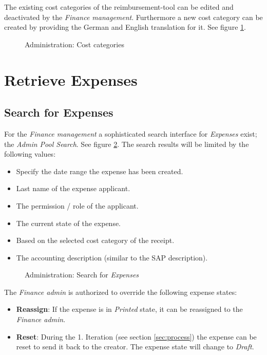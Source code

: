 The existing cost categories of the reimbursement-tool can be edited and deactivated by the \textit{Finance management}. Furthermore a new cost category can be created by providing the German and English translation for it. See figure \ref{fig:admin-costcategories}.

\begin{figure}[H]
    \centering
    \caption{Administration: Cost categories}
    \label{fig:admin-costcategories}
\end{figure}

\section{Retrieve Expenses}
\subsection{Search for Expenses}

For the \textit{Finance management} a sophisticated search interface for \textit{Expenses} exist; the \textit{Admin Pool Search}. See figure \ref{fig:admin-search}. The search results will be limited by the following values:

\begin{itemize}
    \item Specify the date range the expense has been created.
    \item Last name of the expense applicant.
    \item The permission / role of the applicant.
    \item The current state of the expense.
    \item Based on the selected cost category of the receipt.
    \item The accounting description (similar to the SAP description).
\end{itemize}

\begin{figure}[H]
    \centering
    \caption{Administration: Search for \textit{Expenses}}
    \label{fig:admin-search}
\end{figure}

The \textit{Finance admin} is authorized to override the following expense states:
\begin{itemize}
\item \textbf{Reassign}: If the expense is in \textit{Printed} state, it can be reassigned to the \textit{Finance admin}.
\item \textbf{Reset}: During the 1. Iteration (see section \ref{sec:process}) the expense can be reset to send it back to the creator. The expense state will change to \textit{Draft}. 
\end{itemize}

